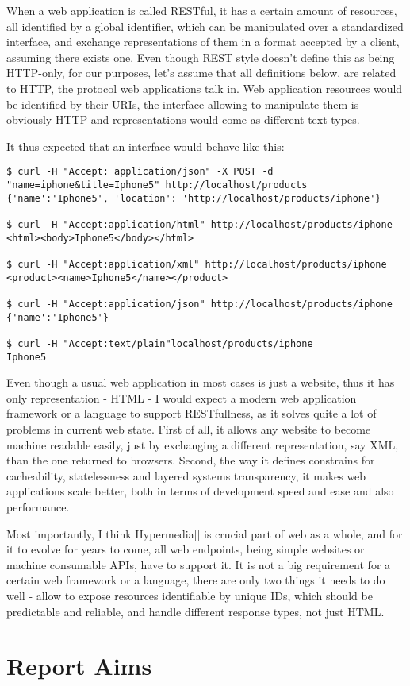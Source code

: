 When a web application is called RESTful, it has a certain amount of resources, all identified by a global identifier, which can be manipulated over a standardized interface, and exchange representations of them in a format accepted by a client, assuming there exists one. Even though REST style doesn't define this as being HTTP-only, for our purposes, let's assume that all definitions below, are related to HTTP, the protocol web applications talk in. Web application resources would be identified by their URIs, the interface allowing to manipulate them is obviously HTTP and representations would come as different text types.

It thus expected that an interface would behave like this:

\begin{codelisting}
\begin{verbatim}
$ curl -H "Accept: application/json" -X POST -d "name=iphone&title=Iphone5" http://localhost/products
{'name':'Iphone5', 'location': 'http://localhost/products/iphone'}

$ curl -H "Accept:application/html" http://localhost/products/iphone
<html><body>Iphone5</body></html>

$ curl -H "Accept:application/xml" http://localhost/products/iphone
<product><name>Iphone5</name></product>

$ curl -H "Accept:application/json" http://localhost/products/iphone
{'name':'Iphone5'}

$ curl -H "Accept:text/plain"localhost/products/iphone
Iphone5
\end{verbatim}
\end{codelisting}

Even though a usual web application in most cases is just a website, thus it has only representation - HTML - I would expect a modern web application framework or a language to support RESTfullness, as it solves quite a lot of problems in current web state. First of all, it allows any website to become machine readable easily, just by exchanging a different representation, say XML, than the one returned to browsers. Second, the way it defines constrains for cacheability, statelessness and layered systems transparency, it makes web applications scale better, both in terms of development speed and ease and also performance. 

Most importantly, I think Hypermedia[] is crucial part of web as a whole, and for it to evolve for years to come, all web endpoints, being simple websites or machine consumable APIs, have to support it. It is not a big requirement for a certain web framework or a language, there are only two things it needs to do well - allow to expose resources identifiable by unique IDs, which should be predictable and reliable, and handle different response types, not just HTML. 

\section{Report Aims}
